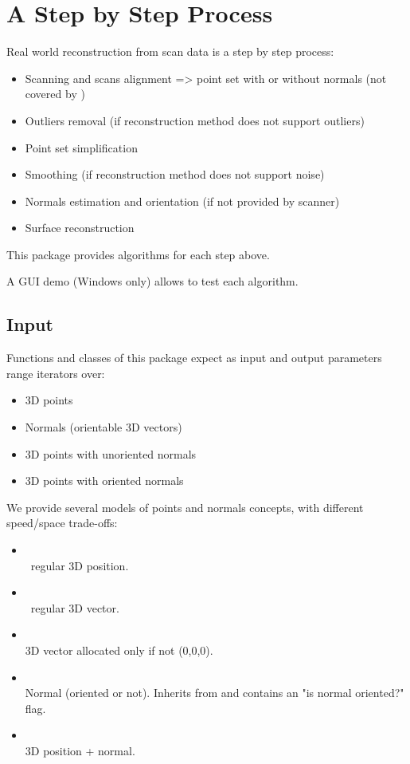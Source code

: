 \section{A Step by Step Process}

Real world reconstruction from scan data is a step by step process:

\begin{itemize}
\item Scanning and scans alignment => point set with or without normals (not covered by \cgal)
\item Outliers removal (if reconstruction method does not support outliers)
\item Point set simplification
\item Smoothing (if reconstruction method does not support noise)
\item Normals estimation and orientation (if not provided by scanner)
\item Surface reconstruction
\end{itemize}

This package provides algorithms for each step above.

A GUI demo (Windows only) allows to test each algorithm.


\subsection{Input}

Functions and classes of this package expect as input and output parameters range iterators over:

\begin{itemize}
\item 3D points
\item Normals (orientable 3D vectors)
\item 3D points with unoriented normals
\item 3D points with oriented normals
\end{itemize}

We provide several models of points and normals concepts, with different speed/space trade-offs:

\begin{itemize}
\item {} \\
\cgal\ regular 3D position.
\item {} \\
\cgal\ regular 3D vector.
\item {} \\
3D vector allocated only if not (0,0,0).
\item {} \\
Normal (oriented or not).
Inherits from  and contains an "is normal oriented?" flag.
\item {} \\
3D position + normal.
\end{itemize}

